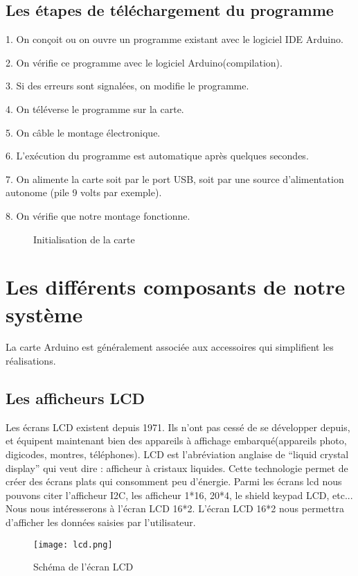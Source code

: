 \documentclass[12pt, openany]{report}
\begin{document}
         		 \subsection{Les étapes de téléchargement du programme }
         		 1. On conçoit ou on ouvre un programme existant avec le logiciel IDE Arduino.
         		
         		 2. On vérifie ce programme avec le logiciel Arduino(compilation).
         		
         		 3. Si des erreurs sont signalées, on modifie le programme.
         		
         		 4. On téléverse le programme sur la carte.
         		
         		 5. On câble le montage électronique.
         		
         		 6. L'exécution du programme est automatique après quelques secondes.
         		
         		 7. On alimente la carte soit par le port USB, soit par une source d'alimentation autonome
         		 (pile 9 volts par exemple).
         		
         		 8. On vérifie que notre montage fonctionne.
      \begin{figure}[!h]
                     \centering
     
              \caption{Initialisation de la carte }
                    		          		
                    		          		 \end{figure}
                \newpage		       		 		
         		
        \section{Les différents composants de notre système}
  La carte Arduino est généralement associée aux accessoires qui simplifient les réalisations.
 \subsection{ Les afficheurs LCD}
  Les écrans LCD existent depuis 1971. Ils n'ont pas cessé de se développer depuis, et équipent maintenant bien des appareils à affichage embarqué(appareils photo, digicodes, montres, téléphones). LCD est l'abréviation anglaise de “liquid crystal display” qui veut dire : afficheur à cristaux liquides. Cette technologie permet de créer des écrans plats qui consomment peu d'énergie. Parmi les écrans lcd nous pouvons citer l'afficheur I2C, les afficheur 1*16, 20*4, le shield keypad LCD, etc... Nous nous intéresserons à l'écran LCD 16*2. L'écran LCD 16*2 nous permettra d'afficher les données saisies par l'utilisateur.
 \begin{figure}[!h]
                \centering
 \texttt{[image: lcd.png]} 
         \caption{Schéma de l'écran LCD }
               		          		
               		          		 \end{figure}
                		 
\end{document}
